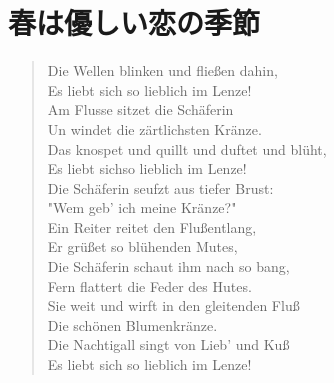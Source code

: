 
\section{春は優しい恋の季節}

\begin{quote}
Die Wellen blinken und flie{\ss}en dahin, \\
Es liebt sich so lieblich im Lenze! \\
Am Flusse sitzet die Sch{\"a}ferin \\
Un windet die z{\"a}rtlichsten Kr{\"a}nze. \\

Das knospet und quillt und duftet und bl{\"u}ht, \\
Es liebt sichso lieblich im Lenze! \\
Die Sch{\"a}ferin seufzt aus tiefer Brust: \\
"Wem geb' ich meine Kr{\"a}nze?" \\

Ein Reiter reitet den Flu\ss entlang, \\
Er gr{\"u}{\ss}et so bl{\"u}henden Mutes, \\
Die Sch{\"a}ferin schaut ihm nach so bang, \\
Fern flattert die Feder des Hutes. \\

Sie weit und wirft in den gleitenden Flu\ss \\
Die sch{\"o}nen Blumenkr{\"a}nze. \\
Die Nachtigall singt von Lieb' und Ku\ss \\
Es liebt sich so lieblich im Lenze!
\end{quote}
